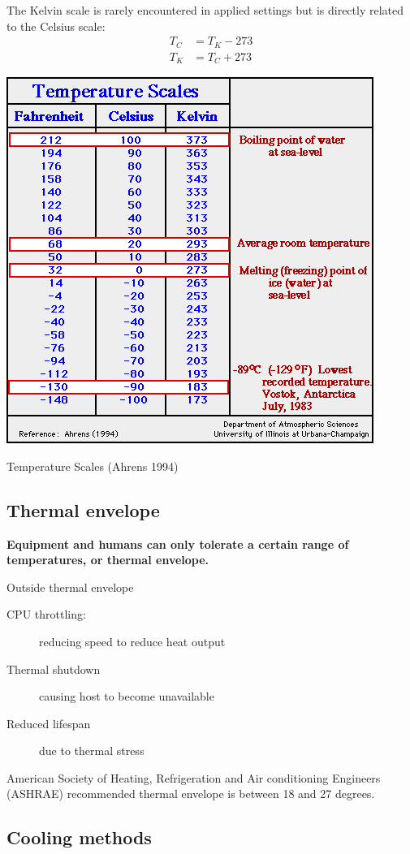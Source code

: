 \documentclass[slides]{pgnotes}
\begin{document}
The Kelvin scale is rarely encountered in applied settings but is directly related to the Celsius scale:
\begin{align}
  T_C & = T_K - 273 \label{eq:k-to-c} \\
  T_K & = T_C + 273 \label{eq:c-to-k} 
\end{align}


\begin{table}[htbp]
  \centering
  \includegraphics[width=0.4\linewidth]{temp_scales_ahrens}
  \caption{Temperature Scales (Ahrens 1994)}
  \label{tab:temp-scales}
\end{table}

\subsection{Thermal envelope}
\label{sec:thermal-envelope}

\textbf{Equipment and humans can only tolerate a certain range of temperatures, or thermal envelope.}

\begin{redbox}{Outside thermal envelope}
  \begin{description}
  \item[CPU throttling:] reducing speed to reduce heat output
  \item[Thermal shutdown] causing host to become unavailable
  \item[Reduced lifespan] due to thermal stress
  \end{description}
\end{redbox}

American Society of Heating, Refrigeration and Air conditioning Engineers (ASHRAE) recommended thermal envelope is between 18 and 27 degrees.


\subsection{Cooling methods}
\end{document}
